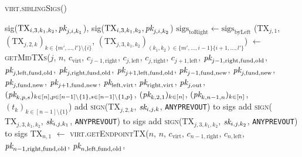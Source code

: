 \begin{center}
\begin{processbox}{\textsc{virt.siblingSigs}()}
\begin{algorithmic}[1]
        \Indent
          \State sig($\mathrm{TX}_{i, 3, k_1, k_2}, \textit{pk}_{j, i, k_1}$),
          sig($\mathrm{TX}_{i, 3, k_1, k_2}, \textit{pk}_{j, i, k_2}$)
        \EndIndent
      \EndIndent
      \State $\mathrm{sigs}_{\mathrm{toRight}} \gets
      \mathrm{sigs}_{\mathrm{byLeft}}$
      \Statex
        \State ($\mathrm{TX}_{j, 1}$, $(\mathrm{TX}_{j, 2, k})_{k \in \{m',
        \dots, l'\} \setminus \{i\}}$, $(\mathrm{TX}_{j, 3, k_1, k_2})_{(k_1,
        k_2) \in \{m', \dots, i-1\} \{i+1, \dots, l'\}}$) $\gets$
        \textsc{getMidTXs}($j$, $n$, $c_{\mathrm{virt}}$, $c_{j-1,
        \mathrm{right}}$, $c_{j, \mathrm{left}}$, $c_{j, \mathrm{right}}$,
        $c_{j+1, \mathrm{left}}$, $\textit{pk}_{j-1, \mathrm{right}, \mathrm{fund},
        \mathrm{old}}$, $\textit{pk}_{j, \mathrm{left}, \mathrm{fund}, \mathrm{old}}$,
        $\textit{pk}_{j, \mathrm{right}, \mathrm{fund}, \mathrm{old}}$, $\textit{pk}_{j+1,
        \mathrm{left}, \mathrm{fund}, \mathrm{old}}$, $\textit{pk}_{j-1, \mathrm{fund},
        \mathrm{new}}$, $\textit{pk}_{j, \mathrm{fund}, \mathrm{new}}$, $\textit{pk}_{j,
        \mathrm{fund}, \mathrm{new}}$, $\textit{pk}_{j+1, \mathrm{fund}, \mathrm{new}}$,
        $\textit{pk}_{\mathrm{left}, \mathrm{virt}}$, $\textit{pk}_{\mathrm{right},
        \mathrm{virt}}$, $\textit{pk}_{j, \mathrm{out}}$, $(\textit{pk}_{k, p,
        s})_{k \in [n], p \in [n-1] \setminus \{1\}, s \in [n-1] \setminus \{1,
        p\}}$, $(\textit{pk}_{k, 2, 1})_{k \in [n]}$, $(\textit{pk}_{k, n-1, n})_{k \in [n]}$,
        $(t_k)_{k \in [n-1] \setminus \{1\}}$)
          \State add \textsc{sign}($\mathrm{TX}_{j, 2, k}$, $\textit{sk}_{i, j, k}$,
          \texttt{ANYPREVOUT}) to sigs
        \EndFor
          \State add \textsc{sign}($\mathrm{TX}_{j, 3, k_1, k_2}$, $\textit{sk}_{i, j,
          k_1}$, \texttt{ANYPREVOUT}) to sigs
          \State add \textsc{sign}($\mathrm{TX}_{j, 3, k_1, k_2}$, $\textit{sk}_{i, j,
          k_2}$, \texttt{ANYPREVOUT}) to sigs
        \EndFor
      \EndFor
       
        \State $\mathrm{TX}_{n, 1}$ $\gets$ \textsc{virt.getEndpointTX}($n$,
        $n$, $c_{\mathrm{virt}}$, $c_{n-1, \mathrm{right}}$, $c_{n,
        \mathrm{left}}$, $\textit{pk}_{n-1, \mathrm{right}, \mathrm{fund},
        \mathrm{old}}$, $\textit{pk}_{n, \mathrm{left}, \mathrm{fund}, \mathrm{old}}$,

\end{algorithmic}
\end{processbox}
\end{center}
